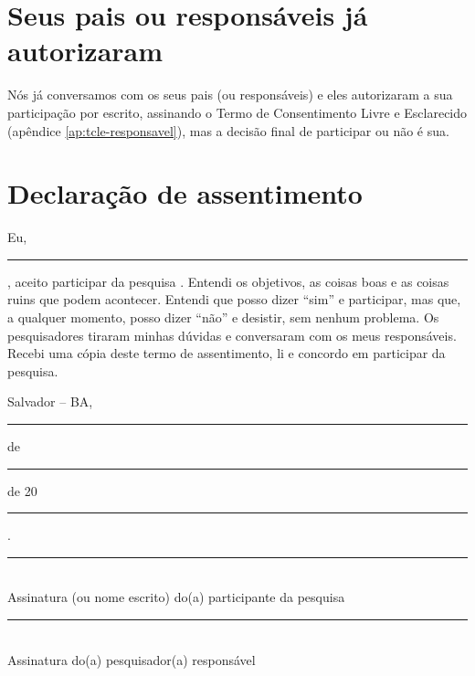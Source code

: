\section{Seus pais ou responsáveis já autorizaram}
Nós já conversamos com os seus pais (ou responsáveis) e eles autorizaram a sua participação por escrito, assinando o Termo de Consentimento Livre e Esclarecido (apêndice \ref{ap:tcle-responsavel}), mas a decisão final de participar ou não é sua.

\section*{Declaração de assentimento}
Eu, \rule{6cm}{0.4pt}, aceito participar da pesquisa \imprimirtitulo. Entendi os objetivos, as coisas boas e as coisas ruins que podem acontecer. Entendi que posso dizer ``sim'' e participar, mas que, a qualquer momento, posso dizer ``não'' e desistir, sem nenhum problema. Os pesquisadores tiraram minhas dúvidas e conversaram com os meus responsáveis. Recebi uma cópia deste termo de assentimento, li e concordo em participar da pesquisa.

\vspace{0.5cm}

\noindent Salvador -- BA, \rule{2cm}{0.4pt} de \rule{3cm}{0.4pt} de 20\rule{1cm}{0.4pt}.

\vspace{1.5cm}

\noindent\rule{9cm}{0.4pt}\\
Assinatura (ou nome escrito) do(a) participante da pesquisa

\vspace{1.5cm}

\noindent\rule{9cm}{0.4pt}\\
Assinatura do(a) pesquisador(a) responsável